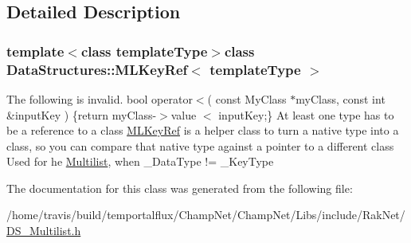 \subsection{Detailed Description}
\subsubsection*{template$<$class template\-Type$>$class Data\-Structures\-::\-M\-L\-Key\-Ref$<$ template\-Type $>$}

The following is invalid. bool operator$<$( const My\-Class $\ast$my\-Class, const int \&input\-Key ) \{return my\-Class-\/$>$value $<$ input\-Key;\} At least one type has to be a reference to a class \hyperlink{class_data_structures_1_1_m_l_key_ref}{M\-L\-Key\-Ref} is a helper class to turn a native type into a class, so you can compare that native type against a pointer to a different class Used for he \hyperlink{class_data_structures_1_1_multilist}{Multilist}, when \-\_\-\-Data\-Type != \-\_\-\-Key\-Type 

The documentation for this class was generated from the following file\-:\begin{DoxyCompactItemize}
\item 
/home/travis/build/temportalflux/\-Champ\-Net/\-Champ\-Net/\-Libs/include/\-Rak\-Net/\hyperlink{_d_s___multilist_8h}{D\-S\-\_\-\-Multilist.\-h}\end{DoxyCompactItemize}
